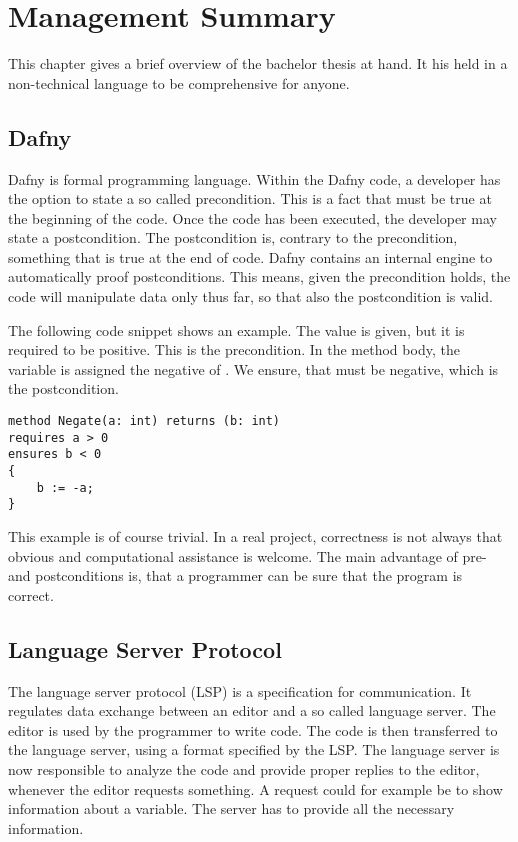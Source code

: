 \section{Management Summary}
\label{section:management_summary}
This chapter gives a brief overview of the bachelor thesis at hand.
It his held in a non-technical language to be comprehensive for anyone.

\subsection{Dafny}
\label{section:introduction:dafny}
Dafny is formal programming language.
Within the Dafny code, a developer has the option to state a so called precondition.
This is a fact that must be true at the beginning of the code.
Once the code has been executed, the developer may state a postcondition.
The postcondition is, contrary to the precondition, something that is true at the end of code.
Dafny contains an internal engine to automatically proof postconditions.
This means, given the precondition holds, the code will manipulate data only thus far, so that also the postcondition is valid.

The following code snippet shows an example.
The value  is given, but it is required to be positive.
This is the precondition.
In the method body, the variable  is assigned the negative of .
We ensure, that  must be negative, which is the postcondition.
\begin{lstlisting}[language=dafny, caption={Simple Dafny Example}, captionpos=b, label={lst:simpleDafnyExample}]
method Negate(a: int) returns (b: int)
requires a > 0
ensures b < 0
{
    b := -a;
}
\end{lstlisting}
This example is of course trivial.
In a real project, correctness is not always that obvious and computational assistance is welcome.
The main advantage of pre- and postconditions is, that a programmer can be sure that the program is correct.


\subsection{Language Server Protocol}
The language server protocol (LSP) is a specification for communication.
It regulates data exchange between an editor and a so called language server.
The editor is used by the programmer to write code.
The code is then transferred to the language server, using a format specified by the LSP.
The language server is now responsible to analyze the code and provide proper replies to the editor, whenever the editor requests something.
A request could for example be to show information about a variable.
The server has to provide all the necessary information.\\

